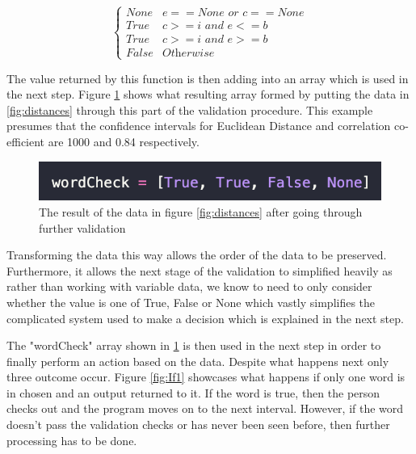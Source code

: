 \documentclass[10pt,a4paper]{report}
\begin{document}
\begin{equation}
	\begin{cases}
		\textit{None} & e == \textit{None or } c == \textit{None} \\
		\textit{True} & c >= i \textit{ and } e <= b \\
		\textit{True} & c >= i \textit{ and } e >= b \\
		\textit{False} & \textit{Otherwise}
	\end{cases}
	\label{fig:DistanceTransform}
\end{equation}

The value returned by this function is then adding into an array which is used in the next step. Figure \ref{fig:wordCheck} shows what resulting array formed by putting the data in \ref{fig:distances} through this part of the validation procedure. This example presumes that the confidence intervals for Euclidean Distance and correlation co-efficient are 1000 and 0.84 respectively.

\begin{figure}[h]
	\centering
	\includegraphics{WordCheck}
	\caption{The result of the data in figure \ref{fig:distances} after going through further validation}
	\label{fig:wordCheck}
\end{figure}

Transforming the data this way allows the order of the data to be preserved. Furthermore, it allows the next stage of the validation to simplified heavily as rather than working with variable data, we know to need to only consider whether the value is one of True, False or None which vastly simplifies the complicated system used to make a decision which is explained in the next step.

The "wordCheck" array shown in \ref{fig:wordCheck} is then used in the next step in order to finally perform an action based on the data. Despite what happens next only three outcome occur. Figure \ref{fig:If1} showcases what happens if only one word is in chosen and an output returned to it. If the word is true, then the person checks out and the program moves on to the next interval. However, if the word doesn't pass the validation checks or has never been seen before, then further processing has to be done. 
\end{document}
